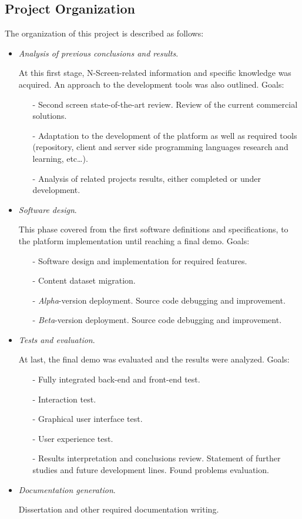 \documentclass{acm_proc_article-sp}
\begin{document}
\subsection{Project Organization}
The organization of this project is described as follows:
\begin{itemize}
  \item \textit{Analysis of previous conclusions and results}. 
  
  At this first stage, N-Screen-related information and specific knowledge was acquired. An approach to the development tools was also outlined. Goals:
  \begin{itemize}
  	\item [-]Second screen state-of-the-art review. Review of the current commercial
solutions.
	\item [-]Adaptation to the development of the platform as well as required tools (repository, client and server side programming languages research and learning, etc\dots).
	\item [-]Analysis of related projects results, either completed or under development. 
  \end{itemize}
  
  \item \textit{Software design}.
  
  This phase covered from the first software definitions and  specifications, to the platform implementation until reaching a final demo. Goals:

  \begin{itemize}
  	\item [-]Software design and implementation for required features.
	\item [-]Content dataset migration. 
	\item [-]\textit{Alpha}-version deployment. Source code
debugging and improvement.
	\item [-]\textit{Beta}-version deployment. Source code
debugging and improvement.  
  \end{itemize}
	
  \item \textit{Tests and evaluation}. 
  
  At last, the final demo was evaluated and the results were analyzed. Goals:
  
  \begin{itemize}
  	\item [-]Fully integrated back-end and front-end test.
	\item [-]Interaction test.
	\item [-]Graphical user interface test.
	\item [-]User experience test.
	\item [-]Results interpretation and conclusions review. Statement of further studies and future development lines. Found problems evaluation.
  \end{itemize}
  
  \item \textit{Documentation generation}.
  
  Dissertation and other required documentation writing. 
\end{itemize}
\end{document}
